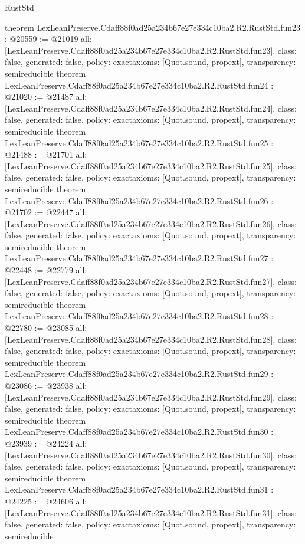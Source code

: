 \begin{lexlean}{RustStd}
\begin{coremodule}
{}
theorem LexLeanPreserve.Cdaff88f0ad25a234b67e27e334c10ba2.R2.RustStd.fun23 : @20559 := @21019 {
  all: [LexLeanPreserve.Cdaff88f0ad25a234b67e27e334c10ba2.R2.RustStd.fun23],
  class: false,
  generated: false,
  policy: exact{axioms: [Quot.sound, propext]},
  transparency: semireducible
}
theorem LexLeanPreserve.Cdaff88f0ad25a234b67e27e334c10ba2.R2.RustStd.fun24 : @21020 := @21487 {
  all: [LexLeanPreserve.Cdaff88f0ad25a234b67e27e334c10ba2.R2.RustStd.fun24],
  class: false,
  generated: false,
  policy: exact{axioms: [Quot.sound, propext]},
  transparency: semireducible
}
theorem LexLeanPreserve.Cdaff88f0ad25a234b67e27e334c10ba2.R2.RustStd.fun25 : @21488 := @21701 {
  all: [LexLeanPreserve.Cdaff88f0ad25a234b67e27e334c10ba2.R2.RustStd.fun25],
  class: false,
  generated: false,
  policy: exact{axioms: [Quot.sound, propext]},
  transparency: semireducible
}
theorem LexLeanPreserve.Cdaff88f0ad25a234b67e27e334c10ba2.R2.RustStd.fun26 : @21702 := @22447 {
  all: [LexLeanPreserve.Cdaff88f0ad25a234b67e27e334c10ba2.R2.RustStd.fun26],
  class: false,
  generated: false,
  policy: exact{axioms: [Quot.sound, propext]},
  transparency: semireducible
}
theorem LexLeanPreserve.Cdaff88f0ad25a234b67e27e334c10ba2.R2.RustStd.fun27 : @22448 := @22779 {
  all: [LexLeanPreserve.Cdaff88f0ad25a234b67e27e334c10ba2.R2.RustStd.fun27],
  class: false,
  generated: false,
  policy: exact{axioms: [Quot.sound, propext]},
  transparency: semireducible
}
theorem LexLeanPreserve.Cdaff88f0ad25a234b67e27e334c10ba2.R2.RustStd.fun28 : @22780 := @23085 {
  all: [LexLeanPreserve.Cdaff88f0ad25a234b67e27e334c10ba2.R2.RustStd.fun28],
  class: false,
  generated: false,
  policy: exact{axioms: [Quot.sound, propext]},
  transparency: semireducible
}
theorem LexLeanPreserve.Cdaff88f0ad25a234b67e27e334c10ba2.R2.RustStd.fun29 : @23086 := @23938 {
  all: [LexLeanPreserve.Cdaff88f0ad25a234b67e27e334c10ba2.R2.RustStd.fun29],
  class: false,
  generated: false,
  policy: exact{axioms: [Quot.sound, propext]},
  transparency: semireducible
}
theorem LexLeanPreserve.Cdaff88f0ad25a234b67e27e334c10ba2.R2.RustStd.fun30 : @23939 := @24224 {
  all: [LexLeanPreserve.Cdaff88f0ad25a234b67e27e334c10ba2.R2.RustStd.fun30],
  class: false,
  generated: false,
  policy: exact{axioms: [Quot.sound, propext]},
  transparency: semireducible
}
theorem LexLeanPreserve.Cdaff88f0ad25a234b67e27e334c10ba2.R2.RustStd.fun31 : @24225 := @24606 {
  all: [LexLeanPreserve.Cdaff88f0ad25a234b67e27e334c10ba2.R2.RustStd.fun31],
  class: false,
  generated: false,
  policy: exact{axioms: [Quot.sound, propext]},
  transparency: semireducible
}
\end{coremodule}
\end{lexlean}
